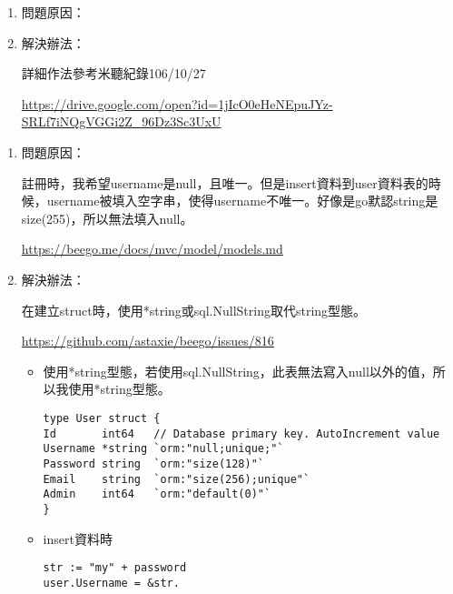 


\begin{enumerate}
\item 問題原因：

\item 解決辦法：

詳細作法參考米聽紀錄106/10/27

\url{https://drive.google.com/open?id=1jIcO0eHeNEpuJYz-SRLf7iNQgVGGi2Z_96Dz3Sc3UxU}


\end{enumerate}



\begin{enumerate}
	\item 問題原因：
	
	註冊時，我希望username是null，且唯一。但是insert資料到user資料表的時候，username被填入空字串，使得username不唯一。好像是go默認string是size(255)，所以無法填入null。
	
	\url{https://beego.me/docs/mvc/model/models.md}
	
	
	\item 解決辦法：
	
	在建立struct時，使用*string或sql.NullString取代string型態。
	
	\url{https://github.com/astaxie/beego/issues/816}
	
	\begin{itemize}
		\item 使用*string型態，若使用sql.NullString，此表無法寫入null以外的值，所以我使用*string型態。
		
		\begin{lstlisting}
type User struct {
Id       int64   // Database primary key. AutoIncrement value
Username *string `orm:"null;unique;"`
Password string  `orm:"size(128)"`
Email    string  `orm:"size(256);unique"`
Admin    int64   `orm:"default(0)"`
}
		\end{lstlisting}
		
		
		\item insert資料時
		
\begin{lstlisting}
str := "my" + password
user.Username = &str.
\end{lstlisting}
	
	\end{itemize}
\end{enumerate}



